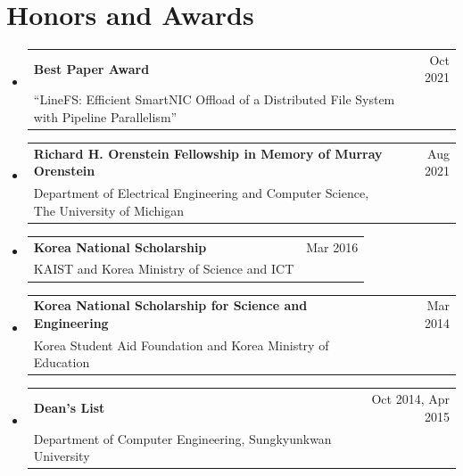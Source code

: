 \documentclass[letterpaper,oneside,11pt]{article}
\makeatletter
\newcommand{\resumeItem}[2]{
  \item\small{
    \textbf{#1}{: #2 \vspace{-3pt}}
  }
}
\newcommand{\resumeSubheading}[4]{
  \vspace{-1pt}\item
    \begin{tabularx}{0.97\textwidth}[t]{X@{\hspace{20pt}}r}
      \textbf{#1} & #2 \\
      \small#3 & \small #4 \\
    \end{tabularx}\vspace{-3pt}
}
\newcommand{\resumeSubItem}[2]{\resumeItem{#1}{#2}\vspace{-5pt}}
\newcommand{\resumeSubHeadingListStart}{\begin{itemize}[leftmargin=*]}
\newcommand{\resumeSubHeadingListEnd}{\end{itemize}}
\makeatother
\begin{document}


\section{Honors and Awards}
  \resumeSubHeadingListStart
    \resumeSubheading{Best Paper Award}{Oct 2021}
    {``LineFS: Efficient SmartNIC Offload of a Distributed File System with Pipeline Parallelism''}{}
    \resumeSubheading{Richard H. Orenstein Fellowship in Memory of Murray Orenstein}{Aug 2021}
    {Department of Electrical Engineering and Computer Science, The University of Michigan}{}
    \resumeSubheading{Korea National Scholarship}{Mar 2016}
    {KAIST and Korea Ministry of Science and ICT}{}
    \resumeSubheading{Korea National Scholarship for Science and Engineering}
    {Mar 2014}
    {Korea Student Aid Foundation and Korea Ministry of Education}{}
    \resumeSubheading{Dean's List}{Oct 2014, Apr 2015}
    {Department of Computer Engineering, Sungkyunkwan University}{}
  \resumeSubHeadingListEnd

%

\end{document}
